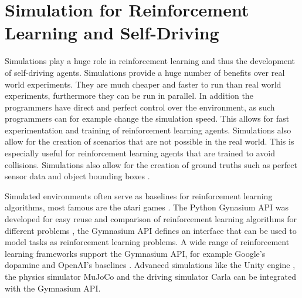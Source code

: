 






\section{Simulation for Reinforcement Learning and Self-Driving}


Simulations play a huge role in reinforcement learning and thus the development of self-driving agents. Simulations provide a huge number of benefits over real world experiments. They are much cheaper and faster to run than real world experiments, furthermore they can be run in parallel. In addition the programmers have direct and perfect control over the environment, as such programmers can for example change the simulation speed. This allows for fast experimentation and training of reinforcement learning agents. Simulations also allow for the creation of scenarios that are not possible in the real world. This is especially useful for reinforcement learning agents that are trained to avoid collisions. Simulations also allow for the creation of ground truths such as perfect sensor data and object bounding boxes \autocite{carla}.

Simulated environments often serve as baselines for reinforcement learning algorithms, most famous are the atari games \autocite{atari}. The Python Gynasium API was developed for easy reuse and comparison of reinforcement learning algorithms for different problems \autocite{gymnasium}, the Gymnasium API defines an interface that can be used to model tasks as reinforcement learning problems. A wide range of reinforcement learning frameworks support the Gymnasium API, for example Google's dopamine \autocite{dopamine} and OpenAI's baselines \autocite{sb3}. Advanced simulations like the Unity engine \autocite{unity}, the physics simulator MuJoCo \autocite{mujoco} and the driving simulator Carla \autocite{carla} can be integrated with the Gymnasium API.



